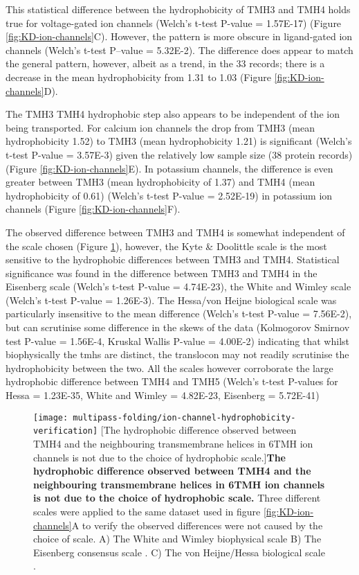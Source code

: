 This statistical difference between the hydrophobicity of TMH3 and TMH4 holds true for voltage\--gated ion channels (Welch's t\--test P\--value = 1.57E-17) (Figure \ref{fig:KD-ion-channels}C).
However, the pattern is more obscure in ligand\--gated ion channels (Welch's t\--test P\---value = 5.32E-2).
The difference does appear to match the general pattern, however, albeit as a trend, in the 33 records; there is a decrease in the mean hydrophobicity from 1.31 to 1.03 (Figure \ref{fig:KD-ion-channels}D).

 The TMH3 TMH4 hydrophobic step also appears to be independent of the ion being transported.
 For calcium ion channels the drop from TMH3 (mean hydrophobicity 1.52) to TMH3 (mean hydrophobicity 1.21) is significant (Welch's t\--test P\--value = 3.57E-3) given the relatively low sample size (38 protein records) (Figure \ref{fig:KD-ion-channels}E).
In potassium channels, the difference is even greater between TMH3 (mean hydrophobicity of 1.37) and TMH4 (mean hydrophobicity of 0.61) (Welch's t\--test P\--value = 2.52E-19) in potassium ion channels (Figure \ref{fig:KD-ion-channels}F).

The observed difference between TMH3 and TMH4 is somewhat independent of the scale chosen (Figure \ref{fig:ion-channel-hydrophobicity-verification}), however, the Kyte \& Doolittle scale is the most sensitive to the hydrophobic differences between TMH3 and TMH4.
Statistical significance was found in the difference between TMH3 and TMH4 in the Eisenberg scale (Welch's t\--test P\--value = 4.74E-23), the White and Wimley scale (Welch's t\--test P\--value = 1.26E-3).
The Hessa/von Heijne biological scale was particularly insensitive to the mean difference (Welch's t\--test P\--value = 7.56E-2), but can scrutinise some difference in the skews of the data (Kolmogorov Smirnov test  P\--value = 1.56E-4, Kruskal Wallis P\--value = 4.00E-2) indicating that whilst biophysically the \gls{tmh}s are distinct, the translocon may not readily scrutinise the hydrophobicity between the two.
All the scales however corroborate the large hydrophobic difference between TMH4 and TMH5 (Welch's t\--test P\--values for Hessa = 1.23E-35, White and Wimley = 4.82E-23, Eisenberg = 5.72E-41)

\begin{figure}[!ht]
\centering
\texttt{[image: multipass-folding/ion-channel-hydrophobicity-verification]}
  [The hydrophobic difference observed between TMH4 and the neighbouring transmembrane helices in 6TMH ion channels is not due to the choice of hydrophobic scale.]{\textbf{The hydrophobic difference observed between TMH4 and the neighbouring transmembrane helices in 6TMH ion channels is not due to the choice of hydrophobic scale.}
  Three different scales were applied to the same dataset used in figure \ref{fig:KD-ion-channels}A to verify the observed differences were not caused by the choice of scale.
  A) The White and Wimley biophysical scale \cite{White1999}
  B) The Eisenberg consensus scale \cite{Eisenberg1984}.
  C) The von Heijne/Hessa biological scale \cite{Hessa2005}.}

\label{fig:ion-channel-hydrophobicity-verification}
\end{figure}

